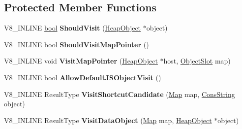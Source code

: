 \subsection*{Protected Member Functions}
\begin{DoxyCompactItemize}
\item 
\mbox{\label{classv8_1_1internal_1_1HeapVisitor_adcdf8103d53d6fd8b5e2d9fd973ae2b4}} 
V8\+\_\+\+I\+N\+L\+I\+NE \mbox{\hyperlink{classbool}{bool}} {\bfseries Should\+Visit} (\mbox{\hyperlink{classv8_1_1internal_1_1HeapObject}{Heap\+Object}} $\ast$object)
\item 
\mbox{\label{classv8_1_1internal_1_1HeapVisitor_ad17144c2f364cffbe8518ffce3b412dc}} 
V8\+\_\+\+I\+N\+L\+I\+NE \mbox{\hyperlink{classbool}{bool}} {\bfseries Should\+Visit\+Map\+Pointer} ()
\item 
\mbox{\label{classv8_1_1internal_1_1HeapVisitor_a3d09bd8b3340e06127e810a3b8a7a3f0}} 
V8\+\_\+\+I\+N\+L\+I\+NE void {\bfseries Visit\+Map\+Pointer} (\mbox{\hyperlink{classv8_1_1internal_1_1HeapObject}{Heap\+Object}} $\ast$host, \mbox{\hyperlink{classv8_1_1internal_1_1ObjectSlot}{Object\+Slot}} map)
\item 
\mbox{\label{classv8_1_1internal_1_1HeapVisitor_aeb0f847fcfe257dad099ac8f9467820f}} 
V8\+\_\+\+I\+N\+L\+I\+NE \mbox{\hyperlink{classbool}{bool}} {\bfseries Allow\+Default\+J\+S\+Object\+Visit} ()
\item 
\mbox{\label{classv8_1_1internal_1_1HeapVisitor_ac03a6866344c30a945911fb2a6b81b9e}} 
V8\+\_\+\+I\+N\+L\+I\+NE Result\+Type {\bfseries Visit\+Shortcut\+Candidate} (\mbox{\hyperlink{classv8_1_1internal_1_1Map}{Map}} map, \mbox{\hyperlink{classv8_1_1internal_1_1ConsString}{Cons\+String}} object)
\item 
\mbox{\label{classv8_1_1internal_1_1HeapVisitor_a59148b7803492493e9b60f1482dc5755}} 
V8\+\_\+\+I\+N\+L\+I\+NE Result\+Type {\bfseries Visit\+Data\+Object} (\mbox{\hyperlink{classv8_1_1internal_1_1Map}{Map}} map, \mbox{\hyperlink{classv8_1_1internal_1_1HeapObject}{Heap\+Object}} $\ast$object)
\item 

\end{DoxyCompactItemize}
